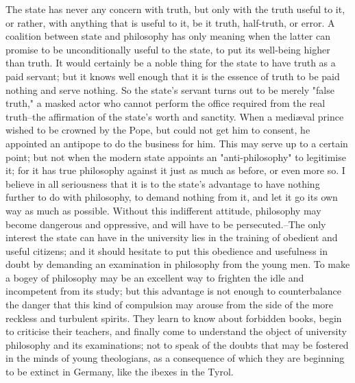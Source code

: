 The state has never any concern with truth, but only with the truth
useful to it, or rather, with anything that is useful to it, be it
truth, half-truth, or error. A coalition between state and philosophy
has only meaning when the latter can promise to be unconditionally
useful to the state, to put its well-being higher than truth. It
would certainly be a noble thing for the state to have truth as a
paid servant; but it knows well enough that it is the essence of
truth to be paid nothing and serve nothing. So the state's servant
turns out to be merely "false truth," a masked actor who cannot
perform the office required from the real truth--the affirmation of
the state's worth and sanctity. When a mediæval prince wished to be
crowned by the Pope, but could not get him to consent, he appointed
an antipope to do the business for him. This may serve up to a
certain point; but not when the modern state appoints an
"anti-philosophy" to legitimise it; for it has true philosophy
against it just as much as before, or even more so. I believe in all
seriousness that it is to the state's advantage to have nothing
further to do with philosophy, to demand nothing from it, and let it
go its own way as much as possible. Without this indifferent
attitude, philosophy may become dangerous and oppressive, and will
have to be persecuted.--The only interest the state can have in the
university lies in the training of obedient and useful citizens; and
it should hesitate to put this obedience and usefulness in doubt by
demanding an examination in philosophy from the young men. To make a
bogey of philosophy may be an excellent way to frighten the idle and
incompetent from its study; but this advantage is not enough to
counterbalance the danger that this kind of compulsion may arouse
from the side of the more reckless and turbulent spirits. They learn
to know about forbidden books, begin to criticise their teachers, and
finally come to understand the object of university philosophy and
its examinations; not to speak of the doubts that may be fostered in
the minds of young theologians, as a consequence of which they are
beginning to be extinct in Germany, like the ibexes in the Tyrol.

